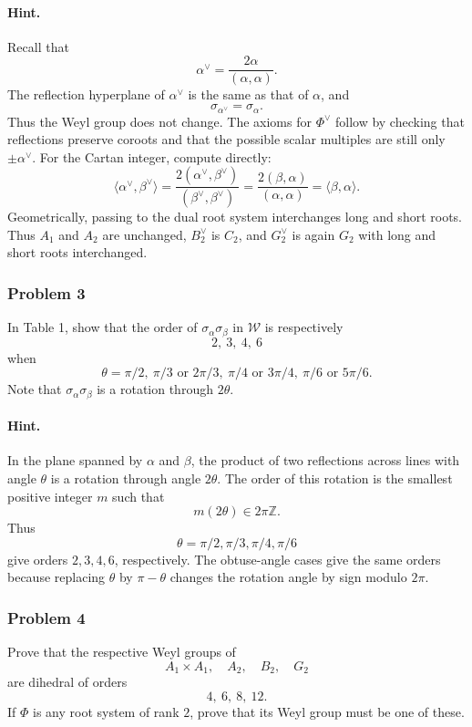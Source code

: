 \documentclass[12pt, a4paper]{article}
\begin{document}
\paragraph{Hint.}
Recall that
\[
\alpha^\vee=\frac{2\alpha}{(\alpha,\alpha)}.
\]
The reflection hyperplane of \(\alpha^\vee\) is the same as that of \(\alpha\),
and
\[
\sigma_{\alpha^\vee}=\sigma_\alpha.
\]
Thus the Weyl group does not change. The axioms for \(\Phi^\vee\) follow by
checking that reflections preserve coroots and that the possible scalar
multiples are still only \(\pm\alpha^\vee\). For the Cartan integer, compute
directly:
\[
\langle \alpha^\vee,\beta^\vee\rangle
=
\frac{2(\alpha^\vee,\beta^\vee)}{(\beta^\vee,\beta^\vee)}
=
\frac{2(\beta,\alpha)}{(\alpha,\alpha)}
=
\langle \beta,\alpha\rangle.
\]
Geometrically, passing to the dual root system interchanges long and short
roots. Thus \(A_1\) and \(A_2\) are unchanged, \(B_2^\vee\) is \(C_2\), and
\(G_2^\vee\) is again \(G_2\) with long and short roots interchanged.

\subsubsection{Problem 3}

In Table 1, show that the order of \(\sigma_\alpha\sigma_\beta\) in
\(\mathcal W\) is respectively
\[
2,\ 3,\ 4,\ 6
\]
when
\[
\theta=\pi/2,\ \pi/3\text{ or }2\pi/3,\ \pi/4\text{ or }3\pi/4,\ 
\pi/6\text{ or }5\pi/6.
\]
Note that \(\sigma_\alpha\sigma_\beta\) is a rotation through \(2\theta\).

\paragraph{Hint.}
In the plane spanned by \(\alpha\) and \(\beta\), the product of two reflections
across lines with angle \(\theta\) is a rotation through angle \(2\theta\). The
order of this rotation is the smallest positive integer \(m\) such that
\[
m(2\theta)\in 2\pi\mathbb Z.
\]
Thus
\[
\theta=\pi/2,\pi/3,\pi/4,\pi/6
\]
give orders \(2,3,4,6\), respectively. The obtuse-angle cases give the same
orders because replacing \(\theta\) by \(\pi-\theta\) changes the rotation
angle by sign modulo \(2\pi\).

\subsubsection{Problem 4}

Prove that the respective Weyl groups of
\[
A_1\times A_1,\quad A_2,\quad B_2,\quad G_2
\]
are dihedral of orders
\[
4,\ 6,\ 8,\ 12.
\]
If \(\Phi\) is any root system of rank \(2\), prove that its Weyl group must be
one of these.
\end{document}
